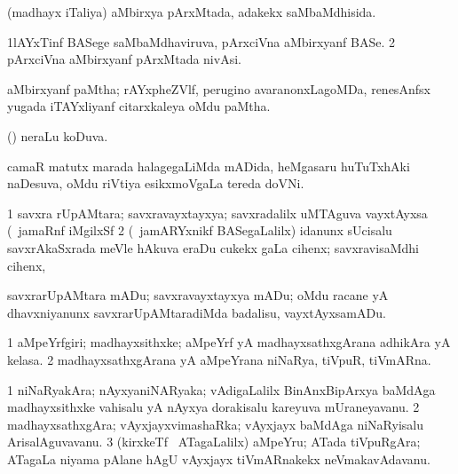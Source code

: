 \bentry
{} 
\gl{\gu}
\expl{}
\bmng
(madhayx iTaliya) aMbirxya pArxMtada, adakekx saMbaMdhisida. 
\emng
\eentry

\bentry
{} 
\gl{\nA}
\expl{}
\bmng
\bnum
\num{1}lAYxTinf BASege saMbaMdhaviruva, pArxciVna aMbirxyanf BASe. 
\num{2} pArxciVna aMbirxyanf pArxMtada nivAsi. 
\enum
\emng
\eentry

\bentry
{}
\gl{\nA}
\expl{}
\bmng
aMbirxyanf paMtha; rAYxpheZVlf, perugino avaranonxLagoMDa, renesAnfsx yugada iTAYxliyanf citarxkaleya oMdu paMtha. 
\emng
\eentry

\bentry
{} 
\gl{\gu}
\expl{}
\bmng
(\aupa) neraLu koDuva. 
\emng
\eentry

\bentry
{} 
\gl{\nA}
\expl{}
\bmng
camaR matutx marada halagegaLiMda mADida, heMgasaru huTuTxhAki naDesuva, oMdu riVtiya esikxmoVgaLa tereda doVNi.  
\emng
\eentry

\bentry
{} 
\gl{\nA}
\expl{}
\bmng
\bnum
\num{1} savxra rUpAMtara; savxravayxtayxya; savxradalilx uMTAguva vayxtAyxsa (\udA\ jamaRnf  iMgilxSf  
\num{2} (\kanmu\ jamARYxnikf BASegaLalilx) idanunx sUcisalu savxrAkaSxrada meVle hAkuva eraDu cukekx gaLa cihenx; savxravisaMdhi cihenx, \udA\  
\enum
\emng
\eentry

\bentry
{} 
\gl{\sakirx}
\expl{}
\bmng
savxrarUpAMtara mADu; savxravayxtayxya mADu; oMdu racane yA dhavxniyanunx savxrarUpAMtaradiMda badalisu, vayxtAyxsamADu. 
\emng
\eentry

\bentry
{} 
\gl{\nA}
\expl{}
\bmng
\bnum
\num{1} aMpeYrfgiri; madhayxsithxke; aMpeYrf yA madhayxsathxgArana adhikAra yA kelasa. 
\num{2} madhayxsathxgArana yA aMpeYrana niNaRya, tiVpuR, tiVmARna. 
\enum
\emng
\eentry

\bentry
{} 
\gl{\nA}
\expl{}
\bmng
\bnum
\num{1} niNaRyakAra; nAyxyaniNARyaka; vAdigaLalilx BinAnxBipArxya baMdAga madhayxsithxke vahisalu yA nAyxya dorakisalu kareyuva mUraneyavanu. 
\num{2} madhayxsathxgAra; vAyxjayxvimashaRka; vAyxjayx baMdAga niNaRyisalu ArisalAguvavanu. 
\num{3} (kirxkeTf \mo\ ATagaLalilx) aMpeYru; ATada tiVpuRgAra; ATagaLa niyama pAlane hAgU vAyxjayx tiVmARnakekx neVmakavAdavanu. 
\enum
\emng
\eentry

